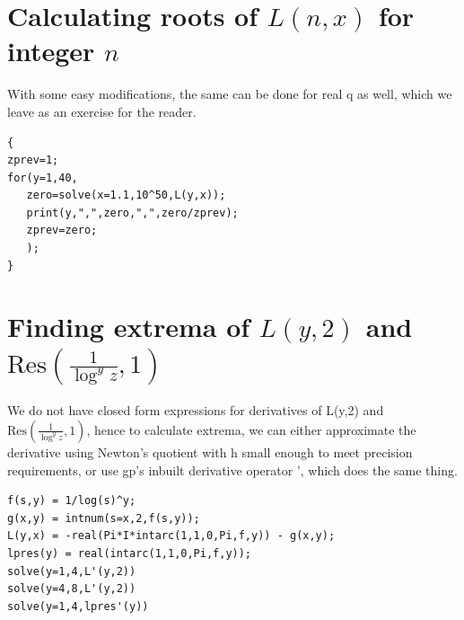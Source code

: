 \documentclass[a4paper,11pt,twoside]{amsart}
\newcommand\Res{\mathrm{Res}}
\begin{document}
\section{Calculating roots of $L(n,x)$ for integer $n$}
With some easy modifications, the same can be done for real q as well, which we leave as an exercise for the reader.

\begin{verbatim}
{
zprev=1;
for(y=1,40,
   zero=solve(x=1.1,10^50,L(y,x));
   print(y,",",zero,",",zero/zprev);
   zprev=zero;
   );
}   
\end{verbatim}

\section{Finding extrema of $L(y,2)$ and $\Res(\frac{1}{\log^{y} z}, 1)$}
We do not have closed form expressions for derivatives of L(y,2) and $\Res(\frac{1}{\log^{y} z}, 1)$, hence to calculate extrema, we can either approximate the derivative using Newton's quotient with h small enough to meet precision requirements, or use gp's inbuilt derivative operator ', which does the same thing.

\begin{verbatim}
f(s,y) = 1/log(s)^y;
g(x,y) = intnum(s=x,2,f(s,y));
L(y,x) = -real(Pi*I*intarc(1,1,0,Pi,f,y)) - g(x,y);
lpres(y) = real(intarc(1,1,0,Pi,f,y));
solve(y=1,4,L'(y,2))
solve(y=4,8,L'(y,2))
solve(y=1,4,lpres'(y))
\end{verbatim}
\end{document}
